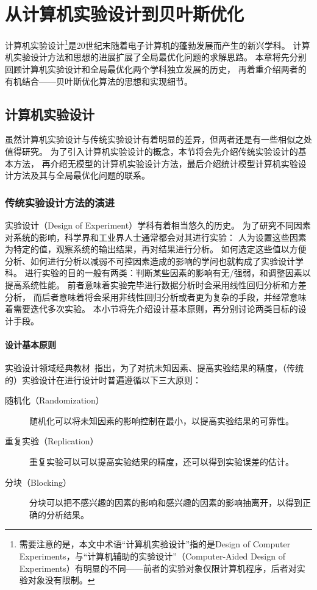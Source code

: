 \documentclass[index]{subfiles}
\begin{document}
\chapter{从计算机实验设计到贝叶斯优化}
计算机实验设计\footnote{需要注意的是，本文中术语“计算机实验设计”指的是Design of Computer Experiments，与“计算机辅助的实验设计”（Computer-Aided Design of Experiments）有明显的不同——前者的实验对象仅限计算机程序，后者对实验对象没有限制。}是20世纪末随着电子计算机的蓬勃发展而产生的新兴学科\cite{mckay1979}。
计算机实验设计方法和思想的进展扩展了全局最优化问题的求解思路。
本章将先分别回顾计算机实验设计和全局最优化两个学科独立发展的历史，
再着重介绍两者的有机结合——贝叶斯优化算法的思想和实现细节。

\section{计算机实验设计}
虽然计算机实验设计与传统实验设计有着明显的差异，但两者还是有一些相似之处值得研究。
为了引入计算机实验设计的概念，本节将会先介绍传统实验设计的基本方法，
再介绍无模型的计算机实验设计方法，最后介绍统计模型计算机实验设计方法及其与全局最优化问题的联系。

\subsection{传统实验设计方法的演进}
实验设计（Design of Experiment）学科有着相当悠久的历史。
为了研究不同因素对系统的影响，科学界和工业界人士通常都会对其进行实验：
人为设置这些因素为特定的值，观察系统的输出结果，再对结果进行分析。
如何选定这些值以方便分析、如何进行分析以减弱不可控因素造成的影响的学问也就构成了实验设计学科\cite{davies1954}。
进行实验的目的一般有两类：判断某些因素的影响有无/强弱，和调整因素以提高系统性能。
前者意味着实验完毕进行数据分析时会采用线性回归分析和方差分析，
而后者意味着将会采用非线性回归分析或者更为复杂的手段，并经常意味着需要迭代多次实验。
本小节将先介绍设计基本原则，再分别讨论两类目标的设计手段。

\subsubsection{设计基本原则}
实验设计领域经典教材~\cite{montgomery}指出，为了对抗未知因素、提高实验结果的精度，（传统的）实验设计在进行设计时普遍遵循以下三大原则：
\begin{description}
  \item[随机化（Randomization）] 随机化可以将未知因素的影响控制在最小，以提高实验结果的可靠性。
  \item[重复实验（Replication）] 重复实验可以可以提高实验结果的精度，还可以得到实验误差的估计。
  \item[分块（Blocking）] 分块可以把不感兴趣的因素的影响和感兴趣的因素的影响抽离开，以得到正确的分析结果。
\end{description}
\end{document}
